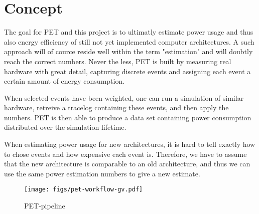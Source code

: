 \section{Concept}
The goal for PET and this project is to ultimatly estimate power usage and thus also
energy efficiency of still not yet implemented computer architectures. A such approach
will of cource reside well within the term "estimation" and will doubtly reach the correct
numbers. Never the less, PET is built by measuring real hardware with great detail, capturing
discrete events and assigning each event a certain amount of energy consumption.

When selected events have been weighted, one can run a simulation of similar hardware, retreive
a tracelog containing these events, and then apply the numbers. PET is then able to produce a data set
containing power consumption distributed over the simulation lifetime.

When estimating power usage for new architectures, it is hard to tell exactly how to chose events and
how expensive each event is. Therefore, we have to assume that the new architecture is comparable to
an old architecture, and thus we can use the same power estimation numbers to give a new estimate.
\begin{figure}
    \texttt{[image: figs/pet-workflow-gv.pdf]}
    \caption{PET-pipeline}
    \label{fig:pipeline}
\end{figure}

